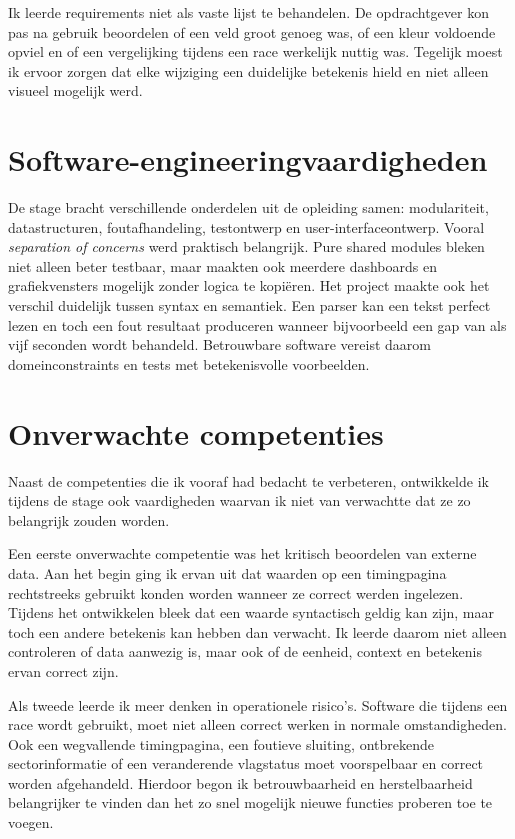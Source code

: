 Ik leerde requirements niet als vaste lijst te behandelen. De opdrachtgever kon pas na gebruik
beoordelen of een veld groot genoeg was, of een kleur voldoende opviel en of een vergelijking
tijdens een race werkelijk nuttig was. Tegelijk moest ik ervoor zorgen dat elke wijziging een duidelijke
betekenis hield en niet alleen visueel mogelijk werd.

\section{Software-engineeringvaardigheden}
De stage bracht verschillende onderdelen uit de opleiding samen: modulariteit, datastructuren,
foutafhandeling, testontwerp en user-interfaceontwerp. Vooral \textit{separation of concerns}
werd praktisch belangrijk. Pure shared modules bleken niet alleen beter testbaar, maar maakten ook
meerdere dashboards en grafiekvensters mogelijk zonder logica te kopiëren.
Het project maakte ook het verschil duidelijk tussen syntax en semantiek. Een parser kan een tekst
perfect lezen en toch een fout resultaat produceren wanneer bijvoorbeeld een gap van  als vijf seconden wordt
behandeld. Betrouwbare software vereist daarom domeinconstraints en tests met betekenisvolle
voorbeelden.

\section{Onverwachte competenties}

Naast de competenties die ik vooraf had bedacht te verbeteren, ontwikkelde ik tijdens de stage ook vaardigheden waarvan ik niet van verwachtte dat ze zo belangrijk zouden worden.

Een eerste onverwachte competentie was het kritisch beoordelen van externe data. Aan het begin ging ik ervan uit dat waarden op een timingpagina rechtstreeks gebruikt konden worden wanneer ze correct werden ingelezen. Tijdens het ontwikkelen bleek dat een waarde syntactisch geldig kan zijn, maar toch een andere betekenis kan hebben dan verwacht. Ik leerde daarom niet alleen controleren of data aanwezig is, maar ook of de eenheid, context en betekenis ervan correct zijn.

Als tweede leerde ik meer denken in operationele risico's. Software die tijdens een race wordt gebruikt, moet niet alleen correct werken in normale omstandigheden. Ook een wegvallende timingpagina, een foutieve sluiting, ontbrekende sectorinformatie of een veranderende vlagstatus moet voorspelbaar en correct worden afgehandeld. Hierdoor begon ik betrouwbaarheid en herstelbaarheid belangrijker te vinden dan het zo snel mogelijk nieuwe functies proberen toe te voegen.

